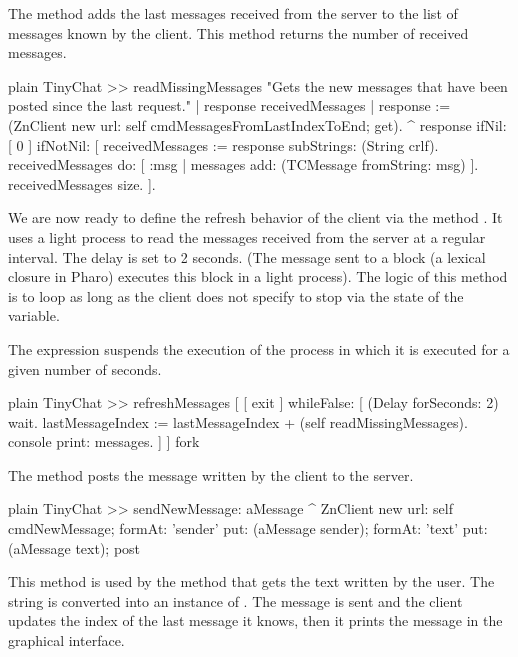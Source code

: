 \documentclass[10pt,twoside,english]{_support/latex/sbabook/sbabook}
\begin{document}
The method  adds the last messages received from the server to the list of messages known by the client. 
This method returns the number of received messages. 

\begin{displaycode}{plain}
TinyChat >> readMissingMessages
	"Gets the new messages that have been posted since the last request."
	| response receivedMessages |
	response := (ZnClient new url: self cmdMessagesFromLastIndexToEnd; get).
	^ response 
		ifNil: [ 0 ]
		ifNotNil: [  
			receivedMessages := response subStrings: (String crlf).
			receivedMessages do: [ :msg | messages add: (TCMessage fromString: msg) ].
			receivedMessages size.
		].
\end{displaycode}

We are now ready to define the refresh behavior of the client via the method .
It uses a light process to read the messages received from the server at a regular interval. 
The delay is set to 2 seconds. (The message  sent to a block (a lexical closure in Pharo) executes this block in a light process). The logic of this method is to loop as long as the client does not specify to stop via the state of the  variable. 

The expression  suspends the execution of the process in which it is executed for a given number of seconds. 

\begin{displaycode}{plain}
TinyChat >> refreshMessages
	[  
		[ exit ] whileFalse: [  
			(Delay forSeconds: 2) wait.
			lastMessageIndex := lastMessageIndex + (self readMissingMessages).
			console print: messages.
		]
	] fork
\end{displaycode}

The method  posts the message written by the client to the server. 

\begin{displaycode}{plain}
TinyChat >> sendNewMessage: aMessage
	^ ZnClient new
		url: self cmdNewMessage;
		formAt: 'sender' put:  (aMessage sender);
		formAt: 'text' put: (aMessage text);
		post
\end{displaycode}

This method is used by the method  that gets the text written by the user. 
The string is converted into an instance of . The message is sent and the client updates the index of the last
message it knows, then it prints the message in the graphical interface.
\end{document}
